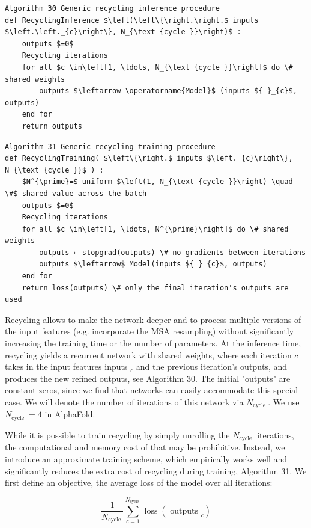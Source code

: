 \documentclass[10pt]{article}
\begin{document}
\begin{verbatim}
Algorithm 30 Generic recycling inference procedure
def RecyclingInference $\left(\left\{\right.\right.$ inputs $\left.\left._{c}\right\}, N_{\text {cycle }}\right)$ :
    outputs $=0$
    Recycling iterations
    for all $c \in\left[1, \ldots, N_{\text {cycle }}\right]$ do \# shared weights
        outputs $\leftarrow \operatorname{Model}$ (inputs ${ }_{c}$, outputs)
    end for
    return outputs
\end{verbatim}

\begin{verbatim}
Algorithm 31 Generic recycling training procedure
def RecyclingTraining( $\left\{\right.$ inputs $\left._{c}\right\}, N_{\text {cycle }}$ ) :
    $N^{\prime}=$ uniform $\left(1, N_{\text {cycle }}\right) \quad \#$ shared value across the batch
    outputs $=0$
    Recycling iterations
    for all $c \in\left[1, \ldots, N^{\prime}\right]$ do \# shared weights
        outputs ← stopgrad(outputs) \# no gradients between iterations
        outputs $\leftarrow$ Model(inputs ${ }_{c}$, outputs)
    end for
    return loss(outputs) \# only the final iteration's outputs are used
\end{verbatim}

Recycling allows to make the network deeper and to process multiple versions of the input features (e.g. incorporate the MSA resampling) without significantly increasing the training time or the number of parameters. At the inference time, recycling yields a recurrent network with shared weights, where each iteration $c$ takes in the input features inputs ${ }_{c}$ and the previous iteration's outputs, and produces the new refined outputs, see Algorithm 30. The initial "outputs" are constant zeros, since we find that networks can easily accommodate this special case. We will denote the number of iterations of this network via $N_{\text {cycle }}$. We use $N_{\text {cycle }}=4$ in AlphaFold.

While it is possible to train recycling by simply unrolling the $N_{\text {cycle }}$ iterations, the computational and memory cost of that may be prohibitive. Instead, we introduce an approximate training scheme, which empirically works well and significantly reduces the extra cost of recycling during training, Algorithm 31. We first define an objective, the average loss of the model over all iterations:


\begin{equation*}
\frac{1}{N_{\text {cycle }}} \sum_{c=1}^{N_{\text {cycle }}} \operatorname{loss}\left(\text { outputs }_{c}\right) \tag{48}
\end{equation*}
\end{document}
